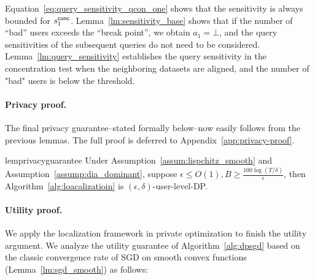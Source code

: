 Equation~\eqref{eq:query_sensitivity_qcon_one} shows that the sensitivity is always bounded for $s^{\mathsf{conc}}_1$.  
Lemma~\ref{lm:sensitivity_base} shows that if the number of ``bad''  
users exceeds the ``break point'', we obtain $a_1 = \bot$, and  
the query sensitivities of the subsequent queries do not need to be considered.  
Lemma~\ref{lm:query_sensitivity} establishes the query sensitivity  
in the concentration test when the neighboring datasets are aligned,  
and the number of "bad" users is below the threshold.

\paragraph{Privacy proof.}


The final privacy guarantee--stated formally below--now easily follows from the previous lemmas.
The full proof is deferred to Appendix~\ref{app:privacy-proof}.

\begin{restatable}{lem}{privacyguarantee}
    \label{lm:privacy_guarantee}
    Under Assumption~\ref{assum:lispchitz_smooth} and Assumption~\ref{assump:dia_dominant}, suppose $\epsilon\le O(1), B\ge\frac{100\log(T/\delta)}{\epsilon}$, then Algorithm~\ref{alg:loacalizatioin} is $(\epsilon,\delta)$-user-level-DP.
\end{restatable}





\paragraph{Utility proof.}
We apply the localization framework in private optimization to finish the utility argument.
We analyze the utility guarantee of Algorithm~\ref{alg:dpsgd} based on the classic convergence rate of SGD on smooth convex functions (Lemma~\ref{lm:sgd_smooth}) as follows:




